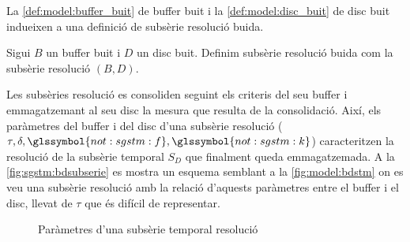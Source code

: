 La \autoref{def:model:buffer_buit} de buffer buit i la
\autoref{def:model:disc_buit} de disc buit indueixen a una definició
de subsèrie resolució buida.  

\begin{definition}\label{def:model:subserie_resolucio_buida}
  Sigui $B$ un buffer buit i $D$ un disc buit.  Definim subsèrie
  resolució buida com la subsèrie resolució $(B,D)$.
\end{definition}


Les subsèries resolució es consoliden seguint els criteris del seu
buffer i emmagatzemant al seu disc la mesura que resulta de la
consolidació. Així, els paràmetres del buffer i del disc d'una
subsèrie resolució ($\tau, \delta, \glssymbol{not:sgstm:f},
\glssymbol{not:sgstm:k}$) caracteritzen la resolució de la subsèrie
temporal $S_D$ que finalment queda emmagatzemada.  A la
\autoref{fig:sgstm:bdsubserie} es mostra un esquema semblant a la
\autoref{fig:model:bdstm} on es veu una subsèrie resolució amb la
relació d'aquests paràmetres entre el buffer i el disc, llevat de
$\tau$ que és difícil de representar.


\begin{figure}[tp]
  \centering
  
  \caption{Paràmetres d'una subsèrie temporal resolució}
  \label{fig:sgstm:bdsubserie}
\end{figure}



